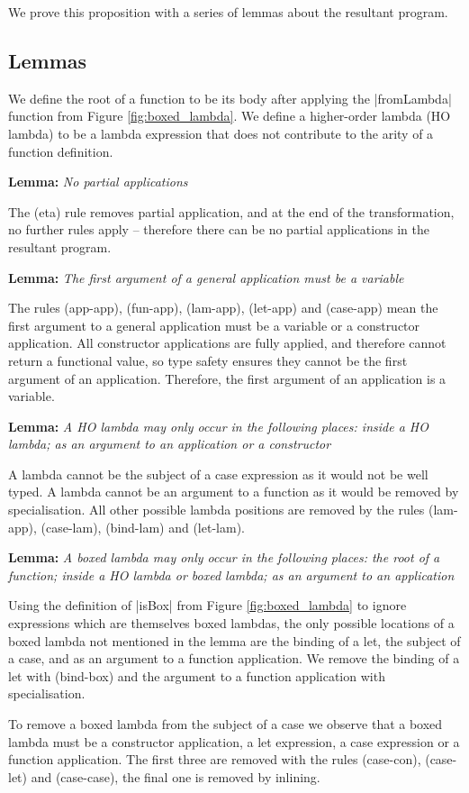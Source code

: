 \documentclass{sigplanconf}
\newenvironment{lemma}[1]
    {\smallskip
     \noindent\textbf{Lemma:} \textit{#1}}
    {\noexample}
\begin{document}
We prove this proposition with a series of lemmas about the resultant program.

\subsection{Lemmas}

We define the root of a function to be its body after applying the |fromLambda| function from Figure \ref{fig:boxed_lambda}. We define a higher-order lambda (HO lambda) to be a lambda expression that does not contribute to the arity of a function definition.

\begin{lemma}{No partial applications}

The (eta) rule removes partial application, and at the end of the transformation, no further rules apply -- therefore there can be no partial applications in the resultant program.
\end{lemma}

\begin{lemma}{The first argument of a general application must be a variable}

The rules (app-app), (fun-app), (lam-app), (let-app) and (case-app) mean the first argument to a general application must be a variable or a constructor application. All constructor applications are fully applied, and therefore cannot return a functional value, so type safety ensures they cannot be the first argument of an application. Therefore, the first argument of an application is a variable.
\end{lemma}

\begin{lemma}{A HO lambda may only occur in the following places: inside a HO lambda; as an argument to an application or a constructor}

A lambda cannot be the subject of a case expression as it would not be well typed. A lambda cannot be an argument to a function as it would be removed by specialisation. All other possible lambda positions are removed by the rules (lam-app), (case-lam), (bind-lam) and (let-lam).
\end{lemma}

\begin{lemma}{A boxed lambda may only occur in the following places: the root of a function; inside a HO lambda or boxed lambda; as an argument to an application}

Using the definition of |isBox| from Figure \ref{fig:boxed_lambda} to ignore expressions which are themselves boxed lambdas, the only possible locations of a boxed lambda not mentioned in the lemma are the binding of a let, the subject of a case, and as an argument to a function application. We remove the binding of a let with (bind-box) and the argument to a function application with specialisation.

To remove a boxed lambda from the subject of a case we observe that a boxed lambda must be a constructor application, a let expression, a case expression or a function application. The first three are removed with the rules (case-con), (case-let) and (case-case), the final one is removed by inlining.
\end{lemma}
\end{document}
